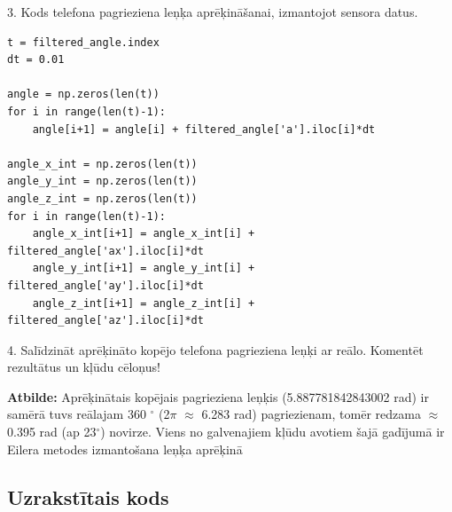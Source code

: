 \documentclass[12pt]{article}
\newlength\tindent
\renewcommand{\indent}{\hspace*{\tindent}}
\begin{document}
3.	Kods telefona pagrieziena leņķa aprēķināšanai, izmantojot sensora datus.
\begin{center}
\begin{verbatim}
t = filtered_angle.index
dt = 0.01

angle = np.zeros(len(t))
for i in range(len(t)-1):
    angle[i+1] = angle[i] + filtered_angle['a'].iloc[i]*dt

angle_x_int = np.zeros(len(t))
angle_y_int = np.zeros(len(t))
angle_z_int = np.zeros(len(t))
for i in range(len(t)-1):
    angle_x_int[i+1] = angle_x_int[i] + filtered_angle['ax'].iloc[i]*dt
    angle_y_int[i+1] = angle_y_int[i] + filtered_angle['ay'].iloc[i]*dt
    angle_z_int[i+1] = angle_z_int[i] + filtered_angle['az'].iloc[i]*dt
\end{verbatim}
\end{center}
4.	Salīdzināt aprēķināto kopējo telefona pagrieziena leņķi ar reālo. Komentēt rezultātus un kļūdu cēloņus!

\indent \textbf{Atbilde:} Aprēķinātais kopējais pagrieziena leņķis (5.887781842843002 rad) ir samērā tuvs reālajam 360 $^{\circ}$ (2$\pi$ $\approx$ 6.283 rad) pagriezienam, tomēr redzama $\approx$ 0.395 rad (ap 23$^{\circ}$) novirze. Viens no galvenajiem kļūdu avotiem šajā gadījumā ir Eilera metodes izmantošana leņķa aprēķinā

\subsection*{Uzrakstītais kods}
\end{document}

